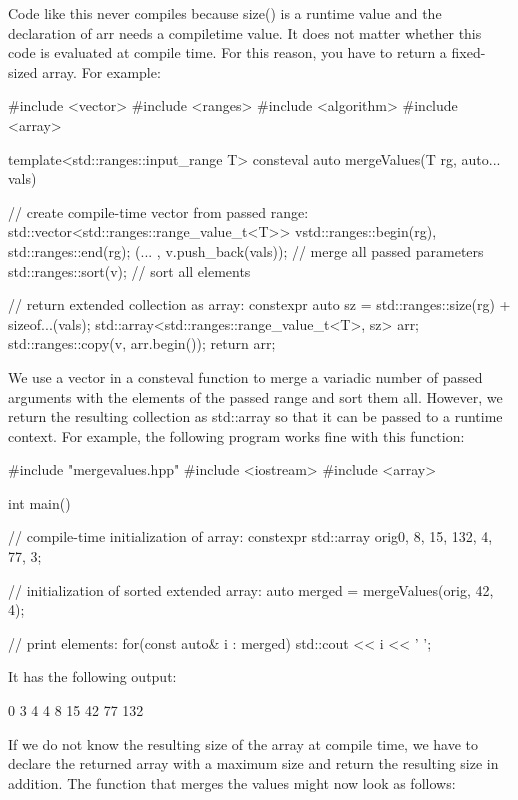 Code like this never compiles because size() is a runtime value and the declaration of arr needs a compiletime value. It does not matter whether this code is evaluated at compile time. For this reason, you have to return a fixed-sized array. For example:


\begin{cpp}
#include <vector>
#include <ranges>
#include <algorithm>
#include <array>

template<std::ranges::input_range T>
consteval auto mergeValues(T rg, auto... vals)
{
	// create compile-time vector from passed range:
	std::vector<std::ranges::range_value_t<T>> v{std::ranges::begin(rg),
												 std::ranges::end(rg)};
	(... , v.push_back(vals)); // merge all passed parameters
	std::ranges::sort(v); // sort all elements

	// return extended collection as array:
	constexpr auto sz = std::ranges::size(rg) + sizeof...(vals);
	std::array<std::ranges::range_value_t<T>, sz> arr{};
	std::ranges::copy(v, arr.begin());
	return arr;
}
\end{cpp}

We use a vector in a consteval function to merge a variadic number of passed arguments with the elements of the passed range and sort them all. However, we return the resulting collection as std::array so that it can be passed to a runtime context. For example, the following program works fine with this function:


\begin{cpp}
#include "mergevalues.hpp"
#include <iostream>
#include <array>

int main()
{
	// compile-time initialization of array:
	constexpr std::array orig{0, 8, 15, 132, 4, 77, 3};
	
	// initialization of sorted extended array:
	auto merged = mergeValues(orig, 42, 4);
	
	// print elements:
	for(const auto& i : merged) {
		std::cout << i << ' ';
	}
}
\end{cpp}

It has the following output:

\begin{shell}
0 3 4 4 8 15 42 77 132
\end{shell}

If we do not know the resulting size of the array at compile time, we have to declare the returned array with a maximum size and return the resulting size in addition. The function that merges the values might now look as follows:

